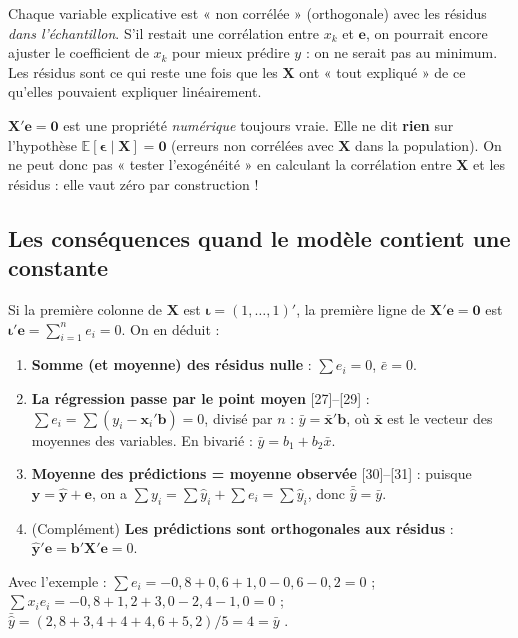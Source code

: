 \documentclass[11pt,a4paper]{article}
\newcommand{\vy}{\mathbf{y}}
\newcommand{\vX}{\mathbf{X}}
\newcommand{\ve}{\mathbf{e}}
\newcommand{\vb}{\mathbf{b}}
\newcommand{\vx}{\mathbf{x}}
\newcommand{\veps}{\bm{\epsilon}}
\newcommand{\vi}{\bm{\iota}}
\newcommand{\E}{\mathbb{E}}
\newcommand{\sumi}{\sum_{i=1}^{n}}
\begin{document}
\begin{intuition}
Chaque variable explicative est « non corrélée » (orthogonale) avec les résidus \emph{dans l'échantillon}. S'il restait une corrélation entre $x_k$ et $\ve$, on pourrait encore ajuster le coefficient de $x_k$ pour mieux prédire $y$ : on ne serait pas au minimum. Les résidus sont ce qui reste une fois que les $\vX$ ont « tout expliqué » de ce qu'elles pouvaient expliquer linéairement.
\end{intuition}

\begin{attention}
$\vX'\ve=\mathbf 0$ est une propriété \emph{numérique} toujours vraie. Elle ne dit \textbf{rien} sur l'hypothèse $\E[\veps\mid\vX]=\mathbf 0$ (erreurs non corrélées avec $\vX$ dans la population). On ne peut donc pas « tester l'exogénéité » en calculant la corrélation entre $\vX$ et les résidus : elle vaut zéro par construction !
\end{attention}

\subsection{Les conséquences quand le modèle contient une constante}
Si la première colonne de $\vX$ est $\vi=(1,\dots,1)'$, la première ligne de $\vX'\ve=\mathbf 0$ est $\vi'\ve=\sumi e_i=0$. On en déduit :
\begin{enumerate}
\item \textbf{Somme (et moyenne) des résidus nulle} : $\sum e_i=0$, $\bar e=0$.
\item \textbf{La régression passe par le point moyen} [27]--[29] : $\sum e_i=\sum(y_i-\vx_i'\vb)=0$, divisé par $n$ : $\bar y=\bar{\vx}'\vb$, où $\bar{\vx}$ est le vecteur des moyennes des variables. En bivarié : $\bar y=b_1+b_2\bar x$.
\item \textbf{Moyenne des prédictions = moyenne observée} [30]--[31] : puisque $\vy=\hat{\vy}+\ve$, on a $\sum y_i=\sum\hat y_i+\sum e_i=\sum\hat y_i$, donc $\bar{\hat y}=\bar y$.
\item (Complément) \textbf{Les prédictions sont orthogonales aux résidus} : $\hat{\vy}'\ve=\vb'\vX'\ve=0$.
\end{enumerate}

\begin{exemple}
Avec l'exemple : $\sum e_i=-0{,}8+0{,}6+1{,}0-0{,}6-0{,}2=0$ \checkmark ; \ $\sum x_ie_i=-0{,}8+1{,}2+3{,}0-2{,}4-1{,}0=0$ \checkmark ; \ $\bar{\hat y}=(2{,}8+3{,}4+4+4{,}6+5{,}2)/5=4=\bar y$ \checkmark.
\end{exemple}
\end{document}
